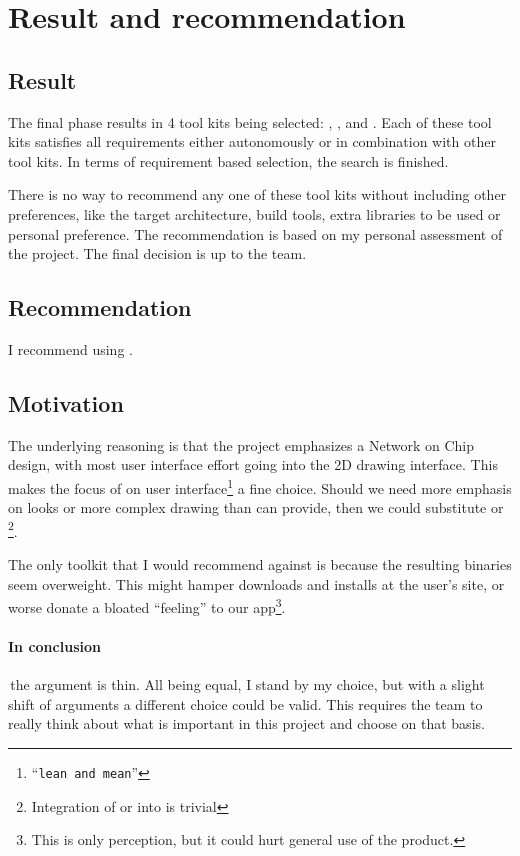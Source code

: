 \section{Result and recommendation}

\subsection{Result}

The final phase results in 4 tool kits being selected: , 
,  and . Each of these tool kits satisfies 
all requirements either autonomously or in combination with other tool 
kits. In terms of requirement based selection, the search is finished. 

There is no way to recommend any one of these tool kits without including other 
preferences, like the target architecture, build tools, extra libraries to be used
or personal preference. The recommendation is based on my personal assessment of 
the project. The final decision is up to the team.

\subsection{Recommendation} 

I recommend using .

\subsection{Motivation}

The underlying reasoning is that the project emphasizes a Network on Chip design, 
with most user interface effort going into the 2D drawing interface. This makes
the focus of  on user interface\footnote{``\texttt{lean and mean}''} 
a fine choice. Should we need more emphasis on looks or more complex drawing 
than  can provide, then we could substitute  or \footnote{%
Integration of  or  into  is trivial}.

The only toolkit that I would recommend against is  because
the resulting binaries seem overweight. This might hamper downloads and installs at 
the user's site, or worse donate a bloated ``feeling'' to our app\footnote{This is only
perception, but it could hurt general use of the product.}. 

\paragraph{In conclusion}\,the argument is thin. All being equal, I stand by my 
choice, but with a slight shift of arguments a different choice could be valid. 
This requires the team to really think about what is important in this project 
and choose on that basis.

